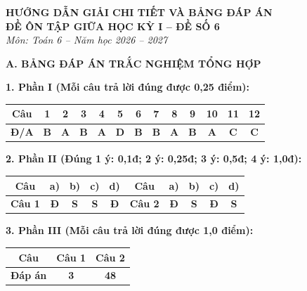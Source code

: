 \documentclass[12pt,a4paper]{article}
\begin{document}
\begin{center}
  \textbf{\Large HƯỚNG DẪN GIẢI CHI TIẾT VÀ BẢNG ĐÁP ÁN}\\
  \textbf{\large ĐỀ ÔN TẬP GIỮA HỌC KỲ I -- ĐỀ SỐ 6}\\
  \textit{Môn: Toán 6 -- Năm học 2026 -- 2027}
\end{center}
\vspace{2mm}

\noindent\textbf{\large A. BẢNG ĐÁP ÁN TRẮC NGHIỆM TỔNG HỢP}
\vspace{1.5mm}

\noindent\textbf{1. Phần I (Mỗi câu trả lời đúng được 0,25 điểm):}
\begin{center}
\begin{tabular}{|c|c|c|c|c|c|c|c|c|c|c|c|c|}
\hline
\textbf{Câu} & \textbf{1} & \textbf{2} & \textbf{3} & \textbf{4} & \textbf{5} & \textbf{6} & \textbf{7} & \textbf{8} & \textbf{9} & \textbf{10} & \textbf{11} & \textbf{12} \\
\hline
\textbf{Đ/A} & \textbf{B} & \textbf{A} & \textbf{B} & \textbf{A} & \textbf{D} & \textbf{B} & \textbf{B} & \textbf{A} & \textbf{B} & \textbf{A} & \textbf{C} & \textbf{C} \\
\hline
\end{tabular}
\end{center}
\vspace{1mm}

\noindent\textbf{2. Phần II (Đúng 1 ý: 0,1đ; 2 ý: 0,25đ; 3 ý: 0,5đ; 4 ý: 1,0đ):}
\begin{center}
\begin{tabular}{|c|c|c|c|c||c|c|c|c|c|}
\hline
\textbf{Câu} & \textbf{a)} & \textbf{b)} & \textbf{c)} & \textbf{d)} & \textbf{Câu} & \textbf{a)} & \textbf{b)} & \textbf{c)} & \textbf{d)} \\
\hline
\textbf{Câu 1} & \textbf{Đ} & \textbf{S} & \textbf{S} & \textbf{Đ} & \textbf{Câu 2} & \textbf{Đ} & \textbf{S} & \textbf{Đ} & \textbf{S} \\
\hline
\end{tabular}
\end{center}
\vspace{1mm}

\noindent\textbf{3. Phần III (Mỗi câu trả lời đúng được 1,0 điểm):}
\begin{center}
\begin{tabular}{|c|c|c|}
\hline
\textbf{Câu} & \textbf{Câu 1} & \textbf{Câu 2} \\
\hline
\textbf{Đáp án} & \textbf{3} & \textbf{48} \\
\hline
\end{tabular}
\end{center}
\vspace{3mm}
\end{document}
